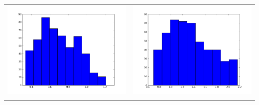\documentclass[12pt,a4paper,titlepage]{article}
\begin{document}
\begin{table}[ht]
\begin{tabular}{cc}
\includegraphics[scale=0.2]{p3th1_1}&\includegraphics[scale=0.2]{p3th2_1.png}\\
\newline

\end{tabular}
\end{table}
\end{document}
